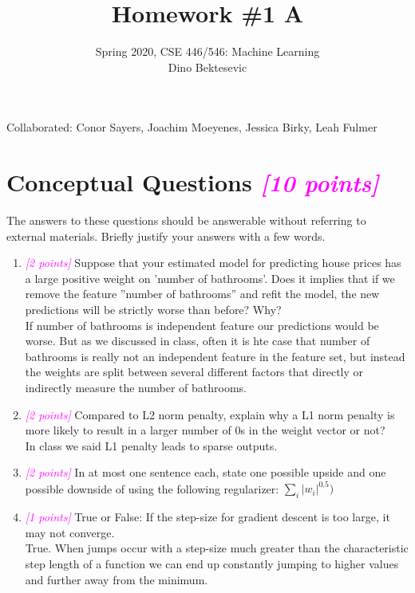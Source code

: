 \documentclass{article}
\date{{}}
\newcommand{\1}{\mathbf{1}}
\newcommand{\points}[1]{\small\textcolor{magenta}{\emph{[#1 points]}} \normalsize}
\begin{document}
\title{Homework \#1 A}
\author{\normalsize{Spring 2020, CSE 446/546: Machine Learning}\\
\normalsize{Dino Bektesevic}}
\maketitle

Collaborated: Conor Sayers, Joachim Moeyenes, Jessica Birky, Leah Fulmer

\section*{Conceptual Questions \points{10} }
The answers to these questions should be answerable without referring to external materials.  Briefly justify your answers with a few words.
\begin{enumerate}
    \item \points{2} Suppose that your estimated model for predicting house prices has a large positive weight on ’number of bathrooms’. Does it implies that if we remove the feature ”number of bathrooms” and refit the model, the new predictions will be strictly worse than before?  Why?\\
    If number of bathrooms is independent feature our predictions would be worse. But as we discussed in class, often it is hte case that number of bathrooms is really not an independent feature in the feature set, but instead the weights are split between several different factors that directly or indirectly measure the number of bathrooms. 
        
    \item \points{2} Compared to L2 norm penalty,  explain why a L1 norm penalty is more likely to result in a larger number of 0s in the weight vector or not?\\
    In class we said L1 penalty leads to sparse outputs. 
        
    \item \points{2} In at most one sentence each, state one possible upside and one possible downside of using the following regularizer: $\sum_i|w_i|^{0.5})$ \\
        
    \item \points{1} True or False:  If the step-size for gradient descent is too large, it may not converge. \\
    True. When jumps occur with a step-size much greater than the characteristic step length of a function we can end up constantly jumping to higher values and further away from the minimum.
    

\end{enumerate}
\end{document}
